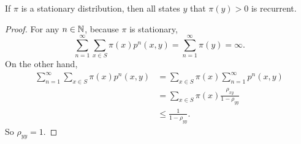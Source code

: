 \begin{thm}
    If $\pi$ is a stationary distribution, then all states $y$ that $\pi(y) > 0$ is recurrent.
\end{thm}
\begin{proof}
    For any $n \in \mathbb{N}$, because $\pi$ is stationary,
    \begin{equation*}
        \sum_{n=1}^{\infty} \sum_{x \in S} \pi(x) p^n(x, y)=\sum_{n=1}^{\infty} \pi(y) = \infty.
    \end{equation*}
    On the other hand,
    \begin{equation*}
        \begin{aligned}
            \sum_{n=1}^{\infty} \sum_{x \in S} \pi(x) p^n(x, y) &= \sum_{x \in S} \pi(x) \sum_{n=1}^{\infty} p^n(x, y) \\
            &=\sum_{x \in S} \pi(x) \frac{\rho_{xy}}{1 - \rho_{yy}} \\
            &\leq \frac{1}{1 - \rho_{yy}}.
        \end{aligned}
    \end{equation*}
    So $\rho_{yy} = 1$.
\end{proof}

